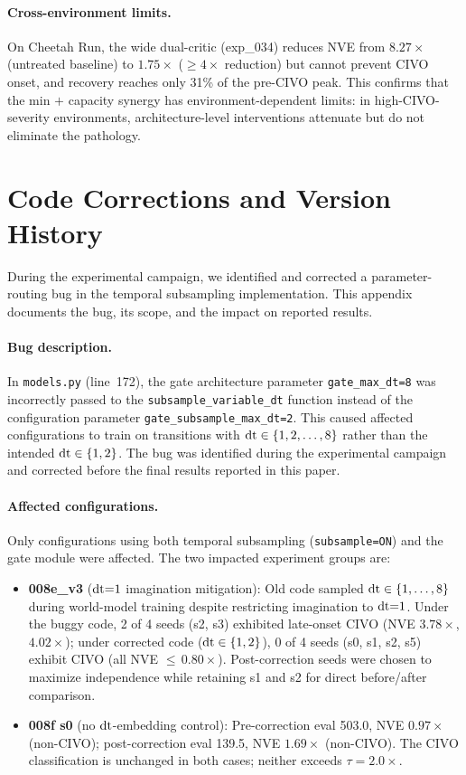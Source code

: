 \paragraph{Cross-environment limits.} On Cheetah Run, the wide dual-critic (exp\_034) reduces NVE from $8.27\times$ (untreated baseline) to $1.75\times$ ($\geq 4\times$ reduction) but cannot prevent CIVO onset, and recovery reaches only 31\% of the pre-CIVO peak. This confirms that the min $+$ capacity synergy has environment-dependent limits: in high-CIVO-severity environments, architecture-level interventions attenuate but do not eliminate the pathology.


\section{Code Corrections and Version History}
\label{sec:code_corrections}

During the experimental campaign, we identified and corrected a parameter-routing bug in the temporal subsampling implementation. This appendix documents the bug, its scope, and the impact on reported results.

\paragraph{Bug description.}
In \texttt{models.py} (line~172), the gate architecture parameter \texttt{gate\_max\_dt=8} was incorrectly passed to the \texttt{subsample\_variable\_dt} function instead of the configuration parameter \texttt{gate\_subsample\_max\_dt=2}. This caused affected configurations to train on transitions with $\mathrm{dt} \in \{1,2,\ldots,8\}$ rather than the intended $\mathrm{dt} \in \{1,2\}$. The bug was identified during the experimental campaign and corrected before the final results reported in this paper.

\paragraph{Affected configurations.}
Only configurations using both temporal subsampling (\texttt{subsample=ON}) and the gate module were affected. The two impacted experiment groups are:

\begin{itemize}[nosep]
\item \textbf{008e\_v3} ($\mathrm{dt}{=}1$ imagination mitigation): Old code sampled $\mathrm{dt} \in \{1,\ldots,8\}$ during world-model training despite restricting imagination to $\mathrm{dt}{=}1$. Under the buggy code, 2 of 4 seeds (s2, s3) exhibited late-onset CIVO (NVE $3.78\times$, $4.02\times$); under corrected code ($\mathrm{dt} \in \{1,2\}$), 0 of 4 seeds (s0, s1, s2, s5) exhibit CIVO (all NVE ${\leq}\,0.80\times$). Post-correction seeds were chosen to maximize independence while retaining s1 and s2 for direct before/after comparison.
\item \textbf{008f s0} (no $\mathrm{dt}$-embedding control): Pre-correction eval 503.0, NVE $0.97\times$ (non-CIVO); post-correction eval 139.5, NVE $1.69\times$ (non-CIVO). The CIVO classification is unchanged in both cases; neither exceeds $\tau{=}2.0\times$.
\end{itemize}

